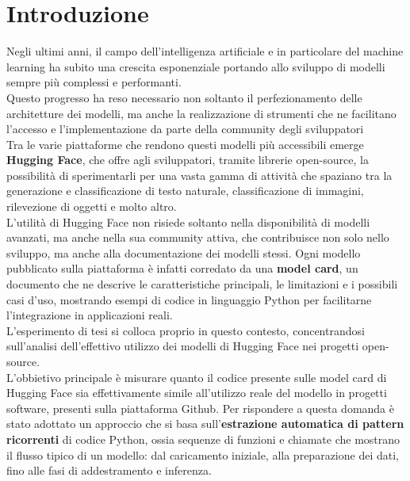 \documentclass{article}
\begin{document}
\section{Introduzione}
Negli ultimi anni, il campo dell'intelligenza artificiale e in particolare del machine learning ha subito una crescita esponenziale portando allo sviluppo di modelli sempre più complessi e performanti.\\
Questo progresso ha reso necessario non soltanto il perfezionamento delle architetture dei modelli, ma anche la realizzazione di strumenti che ne facilitano l'accesso e l'implementazione da parte della community degli sviluppatori\\
Tra le varie piattaforme che rendono questi modelli più accessibili emerge \textbf{Hugging Face}\cite{huggingface}, che offre agli sviluppatori, tramite librerie open-source, la possibilità di sperimentarli per una vasta gamma di attività che spaziano tra la generazione e classificazione di testo naturale, classificazione di immagini, rilevezione di oggetti e molto altro.\\
L'utilità di Hugging Face non risiede soltanto nella disponibilità di modelli avanzati, ma anche nella sua community attiva, che contribuisce non solo nello sviluppo, ma anche alla documentazione dei modelli stessi. Ogni modello pubblicato sulla piattaforma è infatti corredato da una \textbf{model card}, un documento che ne descrive le caratteristiche principali, le limitazioni e i possibili casi d’uso, mostrando esempi di codice in linguaggio Python per facilitarne l’integrazione in applicazioni reali.\\
L'esperimento di tesi si colloca proprio in questo contesto, concentrandosi sull’analisi dell’effettivo utilizzo dei modelli di Hugging Face nei progetti open-source.\\
L'obbietivo principale è misurare quanto il codice presente sulle model card di Hugging Face sia effettivamente simile all'utilizzo reale del modello in progetti software, presenti sulla piattaforma Github. Per rispondere a questa domanda è stato adottato un approccio che si basa sull'\textbf{estrazione automatica di pattern ricorrenti} di codice Python, ossia sequenze di funzioni e chiamate che mostrano il flusso tipico di un modello: dal caricamento iniziale, alla preparazione dei dati, fino alle fasi di addestramento e inferenza.\\
\end{document}
